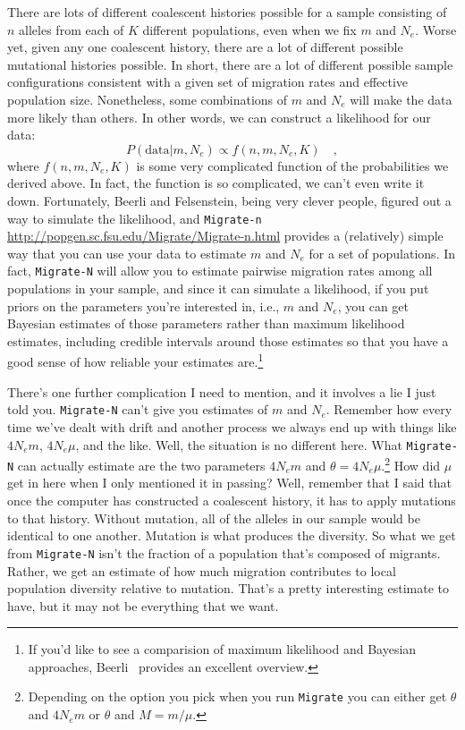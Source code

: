 \documentclass[12pt]{article}
\begin{document}
There are lots of different coalescent histories possible for a sample
consisting of $n$ alleles from each of $K$ different populations, even
when we fix $m$ and $N_e$. Worse yet, given any one coalescent
history, there are a lot of different possible mutational histories
possible. In short, there are a lot of different possible sample
configurations consistent with a given set of migration rates and
effective population size. Nonetheless, some combinations of $m$ and
$N_e$ will make the data more likely than others. In other words, we
can construct a likelihood for our data:
\[
P(\mbox{data}|m, N_e) \propto f(n, m, N_e, K) \quad ,
\]
where $f(n, m, N_e,K)$ is some very complicated function of the
probabilities we derived above. In fact, the function is so
complicated, we can't even write it down. Fortunately, Beerli and
Felsenstein, being very clever people, figured out a way to simulate
the likelihood, and {\tt Migrate-n}
\url{http://popgen.sc.fsu.edu/Migrate/Migrate-n.html} provides a
(relatively) simple way that you can use your data to estimate $m$ and
$N_e$ for a set of populations. In fact, {\tt Migrate-N} will allow
you to estimate pairwise migration rates among all populations in your
sample, and since it can simulate a likelihood, if you put priors on
the parameters you're interested in, i.e., $m$ and $N_e$, you can get
Bayesian estimates of those parameters rather than maximum likelihood
estimates, including credible intervals around those estimates so that
you have a good sense of how reliable your estimates are.\footnote{If
  you'd like to see a comparision of maximum likelihood and Bayesian
  approaches, Beerli~\cite{Beerli-2006} provides an excellent
  overview.}

There's one further complication I need to mention, and it involves a
lie I just told you. {\tt Migrate-N} can't give you estimates of $m$
and $N_e$. Remember how every time we've dealt with drift and another
process we always end up with things like $4N_em$, $4N_e\mu$, and the
like. Well, the situation is no different here. What {\tt Migrate-N} can
actually estimate are the two parameters $4N_em$ and
$\theta=4N_e\mu$.\footnote{Depending on the option you pick when you
  run {\tt Migrate} you can either get $\theta$ and $4N_em$ or
  $\theta$ and $M=m/\mu$.} How did $\mu$ get in here when I only
mentioned it in passing? Well, remember that I said that once the
computer has constructed a coalescent history, it has to apply
mutations to that history. Without mutation, all of the alleles in our
sample would be identical to one another. Mutation is what 
produces the diversity. So what we get from {\tt Migrate-N} isn't the
fraction of a population that's composed of migrants. Rather, we get
an estimate of how much migration contributes to local population
diversity relative to mutation. That's a pretty interesting estimate
to have, but it may not be everything that we want.
\end{document}
